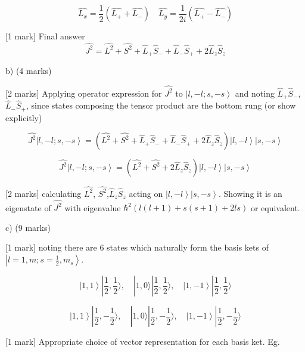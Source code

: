 \documentclass[a4paper,11pt]{article}
\begin{document}
\[ \hat{L_{x}} = \frac{1}{2} (\hat{L_{+}} + \hat{L_{-}}) \quad \hat{L_{y}} = \frac{1}{2i} (\hat{L_{+}} - \hat{L_{-}}) \]

[1 mark] Final answer \[ \hat{J^{2}} =  \hat{L^{2}} + \hat{S^{2}} + \hat{L}_{+}\hat{S}_{-} +  \hat{L}_{-}\hat{S}_{+} + 2\hat{L}_{z}\hat{S}_{z} \]

b) (4 marks)

[2 marks] Applying operator expression for \( \hat{J^{2}} \) to \( \left|l, -l; s, -s \right> \) and noting \( \hat{L}_{+}\hat{S}_{-} \), \( \hat{L}_{-}\hat{S}_{+} \), since states composing the tensor product are the bottom rung (or show explicitly)

\[ 
\hat{J^{2}}\left|l, -l; s, -s \right> = \left( \hat{L^{2}} + \hat{S^{2}} + \hat{L}_{+}\hat{S}_{-} +  \hat{L}_{-}\hat{S}_{+} + 2\hat{L}_{z}\hat{S}_{z} \right) \left|l, -l \right> \left|s, -s \right>  
\]

\[
\hat{J^{2}}\left|l, -l; s, -s \right> = \left( \hat{L^{2}} + \hat{S^{2}} + 2\hat{L}_{z}\hat{S}_{z} \right)  \left|l, -l \right> \left|s, -s \right>
\]

[2 marks] calculating \( \hat{L^{2}} \), \( \hat{S^{2}} \),\( \hat{L}_{z}\hat{S}_{z} \) acting on \( \left|l, -l \right> \left|s, -s \right> \). Showing it is an eigenstate of  \( \hat{J^{2}} \) with eigenvalue \( \hbar^2 \left ( l(l+1) + s(s+1) + 2ls \right ) \) or equivalent. 

c) (9 marks)

[1 mark] noting there are 6 states which naturally form the basis kets of \( \left|l=1, m; s=\frac{1}{2}, m_{s} \right> \).

\[ \left|1, 1 \right> |\frac{1}{2},\frac{1}{2} \rangle, \quad |1, 0 \rangle |\frac{1}{2}, \frac{1}{2} \rangle, \quad \left|1, -1 \right>|\frac{1}{2}, \frac{1}{2} \rangle \]

\[ \left|1, 1 \right> |\frac{1}{2},-\frac{1}{2} \rangle, \quad |1, 0 \rangle |\frac{1}{2}, -\frac{1}{2} \rangle, \quad \left|1, -1 \right>|\frac{1}{2}, -\frac{1}{2} \rangle \]

[1 mark] Appropriate choice of vector representation for each basis ket. Eg. 
\end{document}
